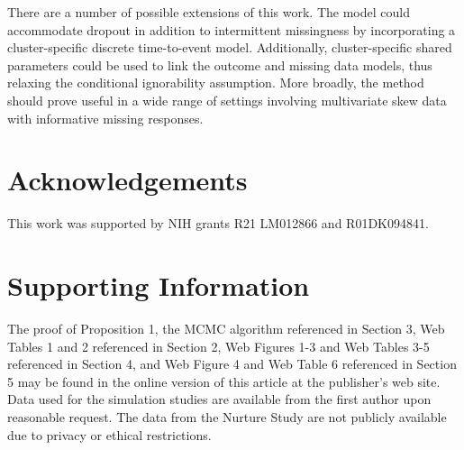 \documentclass[useAMS,usenatbib,referee]{biom}
\begin{document}
There are a number of possible extensions of this work. The model could accommodate dropout in addition to intermittent missingness by incorporating a cluster-specific discrete time-to-event model. Additionally, cluster-specific shared parameters could be used to link the outcome and missing data models, thus relaxing the conditional ignorability assumption. More broadly, the method should prove useful in a wide range of settings involving multivariate skew data with informative missing responses.

 





\backmatter


\section*{Acknowledgements}
This work was supported by NIH grants R21 LM012866 and R01DK094841. %
\section*{Supporting Information}
The proof of Proposition 1, the MCMC algorithm referenced in Section 3, Web Tables 1 and 2 referenced in Section 2, Web Figures 1-3 and Web Tables 3-5 referenced in Section 4, and Web Figure 4 and Web Table 6 referenced in Section 5 may be found in the online version of this article at the publisher's web site. Data used for the simulation studies are available from the first author upon reasonable request. The data from the Nurture Study are not publicly available due to privacy or ethical restrictions.
\end{document}
